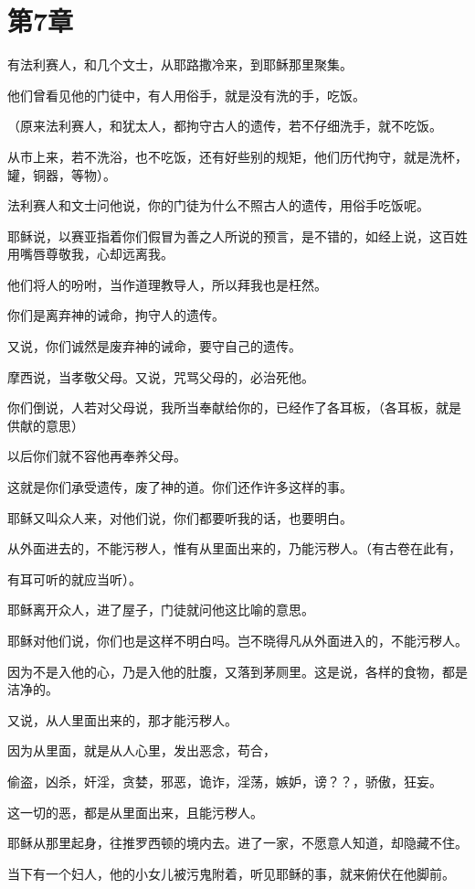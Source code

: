 \documentclass[12pt,oneside]{book}
\begin{document}
\chapter{第7章}
有法利赛人，和几个文士，从耶路撒冷来，到耶稣那里聚集。

他们曾看见他的门徒中，有人用俗手，就是没有洗的手，吃饭。

（原来法利赛人，和犹太人，都拘守古人的遗传，若不仔细洗手，就不吃饭。

从市上来，若不洗浴，也不吃饭，还有好些别的规矩，他们历代拘守，就是洗杯，罐，铜器，等物）。

法利赛人和文士问他说，你的门徒为什么不照古人的遗传，用俗手吃饭呢。

耶稣说，以赛亚指着你们假冒为善之人所说的预言，是不错的，如经上说，这百姓用嘴唇尊敬我，心却远离我。

他们将人的吩咐，当作道理教导人，所以拜我也是枉然。

你们是离弃神的诫命，拘守人的遗传。

又说，你们诚然是废弃神的诫命，要守自己的遗传。

摩西说，当孝敬父母。又说，咒骂父母的，必治死他。

你们倒说，人若对父母说，我所当奉献给你的，已经作了各耳板，（各耳板，就是供献的意思）

以后你们就不容他再奉养父母。

这就是你们承受遗传，废了神的道。你们还作许多这样的事。

耶稣又叫众人来，对他们说，你们都要听我的话，也要明白。

从外面进去的，不能污秽人，惟有从里面出来的，乃能污秽人。（有古卷在此有，

有耳可听的就应当听）。

耶稣离开众人，进了屋子，门徒就问他这比喻的意思。

耶稣对他们说，你们也是这样不明白吗。岂不晓得凡从外面进入的，不能污秽人。

因为不是入他的心，乃是入他的肚腹，又落到茅厕里。这是说，各样的食物，都是洁净的。

又说，从人里面出来的，那才能污秽人。

因为从里面，就是从人心里，发出恶念，苟合，

偷盗，凶杀，奸淫，贪婪，邪恶，诡诈，淫荡，嫉妒，谤？？，骄傲，狂妄。

这一切的恶，都是从里面出来，且能污秽人。

耶稣从那里起身，往推罗西顿的境内去。进了一家，不愿意人知道，却隐藏不住。

当下有一个妇人，他的小女儿被污鬼附着，听见耶稣的事，就来俯伏在他脚前。
\end{document}
